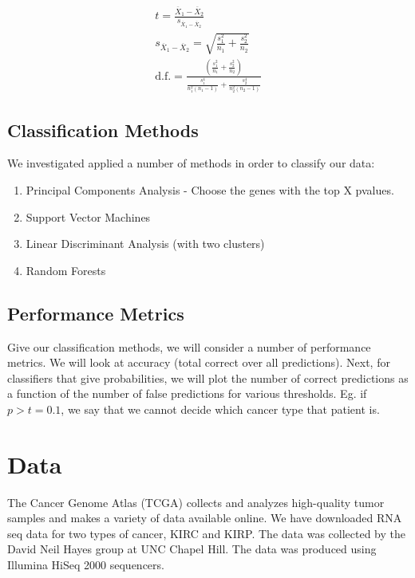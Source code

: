 \begin{gather}
t = \frac{\overline{X}_1-\overline{X}_2}{s_{\overline{X}_1-\overline{X}_2}} \\
s_{\overline{X}_1-\overline{X}_2} = \sqrt{\frac{s_1^2}{n_1}+\frac{s_2^2}{n_2}} \\
\text{d.f.} = \frac{\left(\frac{s_1^2}{n_1}+\frac{s_2^2}{n_2} \right)}{\frac{s_1^4}{n_1^2(n_1-1)} + \frac{s_2^4}{n_2^2(n_2-1)}}
\end{gather}

\subsection{Classification Methods}

We investigated applied a number of methods in order to classify our data:

\begin{enumerate}
\item Principal Components Analysis - Choose the genes with the top X pvalues. 
\item Support Vector Machines
\item Linear Discriminant Analysis (with two clusters)
\item Random Forests
\end{enumerate}

\subsection{Performance Metrics}

Give our classification methods, we will consider a number of performance
metrics. We will look at accuracy (total correct over all predictions). Next,
for classifiers that give probabilities, we will plot the number of correct
predictions as a function of the number of false predictions for various
thresholds. Eg. if $p>t=0.1$, we say that we cannot decide which cancer type
that patient is. 

\section{Data}

The Cancer Genome Atlas (TCGA) collects and analyzes high-quality tumor samples
and makes a variety of data available online. We have downloaded RNA seq data
for two types of cancer, KIRC and KIRP. The data was collected by the David
Neil Hayes group at UNC Chapel Hill. The data was produced using Illumina HiSeq
2000 sequencers. 

